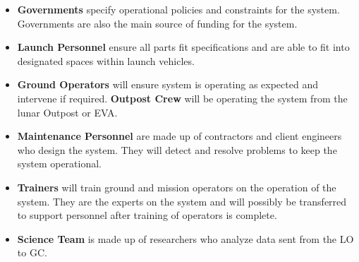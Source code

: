 \begin{itemize}[label={},leftmargin=0pt]
\item\textbf{Governments} specify operational policies and constraints for the system. Governments are also the main source of funding for the system.
\item\textbf{Launch Personnel} ensure all parts fit specifications and are able to fit into designated spaces within launch vehicles.
\item\textbf{Ground Operators} will ensure system is operating as expected and intervene if required.
\textbf{Outpost Crew} will be operating the system from the lunar Outpost or \gls{EVA}.
\item\textbf{Maintenance Personnel} are made up of contractors and client engineers who design the system. They will detect and resolve problems to keep the system operational.
\item\textbf{Trainers} will train ground and mission operators on the operation of the system. They are the experts on the system and will possibly be transferred to support personnel after training of operators is complete.
\item\textbf{Science Team} is made up of researchers who analyze data sent from the \gls{LO} to \gls{GC}.
\end{itemize}